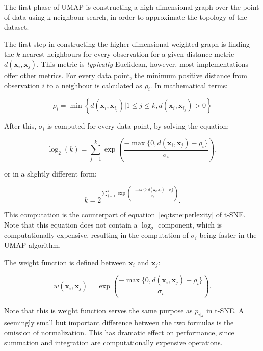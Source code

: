 The first phase of UMAP is constructing a high dimensional graph over the point of data using k-neighbour search, in order to approximate the topology of the dataset.

The first step in constructing the higher dimensional weighted graph is finding the $k$ nearest neighbours for every observation for a given distance metric $d(\mathbf{x}_i, \mathbf{x}_j)$. This metric is \textit{typically} Euclidean, however, most implementations offer other metrics. For every data point, the minimum positive distance from observation $i$ to a neighbour is calculated as $\rho_i$. In mathematical terms:

\begin{equation}
	\rho_i = \min \left\lbrace  d(\mathbf{x}_i, \mathbf{x}_{i_j}) \vert 1 \leq j \leq k, d(\mathbf{x}_i, \mathbf{x}_{i_j}) > 0 \right\rbrace
\end{equation}

After this, $\sigma_{i}$ is computed for every data point, by solving the equation:

\begin{equation}
	\log_2(k)=\sum_{j=1}^{k}\exp\left({\frac{-\max\{0,d(\mathbf{x}_i, \mathbf{x}_j)-\rho_i\}}{\sigma_i}}\right),
\end{equation}

or in a slightly different form:

\begin{equation}
	k=2^{\sum_{j=1}^{k}\exp\left({\frac{-\max\{0,d(\mathbf{x}_i, \mathbf{x}_j)-\rho_i\}}{\sigma_i}}\right)}.
\end{equation}

This computation is the counterpart of equation~\eqref{eq:tsne:perlexity} of t-SNE. Note that this equation does not contain a $\log_2$ component, which is computationally expensive, resulting in the computation of $\sigma_i$ being faster in the UMAP algorithm.

The weight function is defined between $\mathbf{x}_i$ and $\mathbf{x}_j$:

\begin{equation}
	w(\mathbf{x}_i, \mathbf{x}_j) = \exp\left({\frac{-\max\{0,d(\mathbf{x}_i, \mathbf{x}_j) - \rho_i\}} {\sigma_i}} \right).
\end{equation}

Note that this is weight function serves the same purpose as $p_{i|j}$ in t-SNE. A seemingly small but important difference between  the two formulas is the omission of normalization. This has dramatic effect on performance, since summation and integration are computationally expensive operations.

